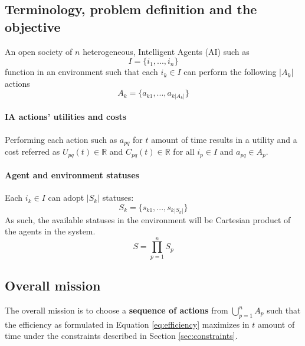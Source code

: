 \documentclass{article}
\begin{document}
\begin{multicols}{2}
	\section{Terminology, problem definition and the objective} \label{sec:problem-definition}
		An open society of $n$ heterogeneous, Intelligent Agents (AI) such as 
		\begin{equation}
			I = \{i_1,..., i_n\}
			\label{eq:agents-list}
		\end{equation}
		function in an environment such that each $i_k \in I$ can perform the following $|A_k|$ actions
		\begin{equation}
			A_k = \{a_{k1},...,a_{k|A_k|}\}
			\label{eq:agents-actions-list}
		\end{equation}
		
		\paragraph{IA actions' utilities and costs} Performing each action such as $a_{pq}$ for $t$ amount of time results in a utility and a cost referred as $U_{pq}(t) \in \mathbb{R}$ and $C_{pq}(t)  \in \mathbb{R}$ for all $i_p \in I$ and $a_{pq} \in A_p$. 
		
		\paragraph{Agent and environment statuses} Each $i_k \in I$ can adopt $|S_k|$ statuses:  
			\begin{equation}
				S_k = \{s_{k1},...,s_{k|S_k|}\}
				\label{eq:agents-status-list}
			\end{equation}
			As such, the available statuses in the environment will be Cartesian product of the agents in the system. 
			\begin{equation}
				S = \prod\limits_{p=1}^{n} S_p
				\label{eq:environment-statuses}
			\end{equation}
		
		\subsection{Overall mission}\label{sec:problem}
			The overall mission is to choose a \textbf{sequence of actions} from $\bigcup\limits_{p=1}^{n}A_p$ such that the efficiency as formulated in Equation \ref{eq:efficiency} maximizes in $t$ amount of time under the constraints described in Section \ref{sec:constraints}.

\end{multicols}
\end{document}
